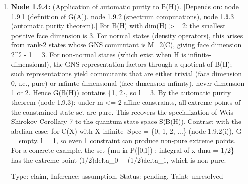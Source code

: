 \documentclass{article}
\begin{document}
\begin{enumerate}
\begin{enumerate}
\item \textbf{Node 1.9.4:} (Application of automatic purity to B(H)). [Depends on: node 1.9.1 (definition of G(A)), node 1.9.2 (spectrum computations), node 1.9.3 (automatic purity theorem).] For B(H) with dim(H) >= 2: the smallest positive face dimension is 3. For normal states (density operators), this arises from rank-2 states whose GNS commutant is M\_2(C), giving face dimension 2\textasciicircum{}2 - 1 = 3. For non-normal states (which exist when H is infinite-dimensional), the GNS representation factors through a quotient of B(H); such representations yield commutants that are either trivial (face dimension 0, i.e., pure) or infinite-dimensional (face dimension infinity), never dimension 1 or 2. Hence G(B(H)) contains \{1, 2\}, so l = 3. By the automatic purity theorem (node 1.9.3): under m <= 2 affine constraints, all extreme points of the constrained state set are pure. This recovers the specialization of Weis-Shirokov Corollary 7 to the quantum state space S(B(H)). Contrast with the abelian case: for C(X) with X infinite, Spec = \{0, 1, 2, ...\} (node 1.9.2(i)), G = empty, l = 1, so even 1 constraint can produce non-pure extreme points. For a concrete example, the set \{mu in P([0,1]) : integral of x dmu = 1/2\} has the extreme point (1/2)delta\_0 + (1/2)delta\_1, which is non-pure.

  Type: claim, Inference: assumption, Status: pending, Taint: unresolved


\end{enumerate}
\end{enumerate}
\end{document}
